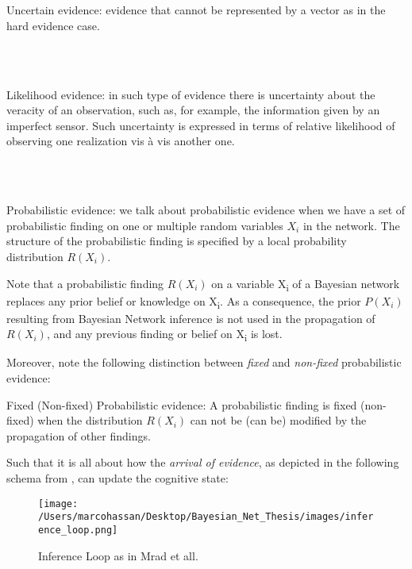 \documentclass[11pt]{article}
\begin{document}
\begin{article}
\\\\

\begin{definition}
Uncertain evidence: evidence that cannot be represented by a vector
as in the hard evidence case.
\end{definition}

\\\\

\begin{definition}
Likelihood evidence: in such type of evidence there is uncertainty
about the veracity of an observation, such as, for example, the
information given by an imperfect sensor. Such uncertainty is
expressed in terms of relative likelihood of observing one
realization vis à vis another one. 
\end{definition}

\\\\

\begin{definition}
Probabilistic evidence: we talk about probabilistic evidence when we
have a set of probabilistic finding on one or multiple random variables $X_i$ in the network.
The structure of the probabilistic finding is specified by a local probability distribution $R(X_i)$.
\end{definition}  

Note that a probabilistic finding \(R(X_i)\) on a variable X\textsubscript{i} of a
Bayesian network replaces any prior belief or knowledge on X\textsubscript{i}. As
a consequence, the prior \(P (X_i)\) resulting from Bayesian Network
inference is not used in the propagation of \(R(X_i)\), and any
previous finding or belief on X\textsubscript{i} is lost.

Moreover, note the following distinction between \emph{fixed} and
\emph{non-fixed} probabilistic evidence:

\begin{definition}
Fixed (Non-fixed) Probabilistic evidence: A probabilistic finding
is fixed (non-fixed) when the distribution $R(X_i)$ can not be (can
be) modified by the propagation of other findings.
\end{definition}  

Such that it is all about how the \emph{arrival of evidence}, as depicted
in the following schema from \cite{Mrad_2015}, can update the
cognitive state:

\begin{figure}[htbp]
\centering
\texttt{[image: /Users/marcohassan/Desktop/Bayesian\_Net\_Thesis/images/inference\_loop.png]}
\caption{Inference Loop as in Mrad et all.}
\end{figure}



\end{article}
\end{document}
